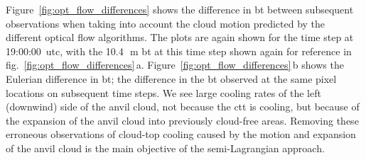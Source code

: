 Figure~\ref{fig:opt_flow_differences} shows the difference in \acrshort{bt} between subsequent observations when taking into account the cloud motion predicted by the different optical flow algorithms.
The plots are again shown for the time step at 19:00:00~\acrshort{utc}, with the 10.4\,\unit{\mu m} \acrshort{bt} at this time step shown again for reference in fig.~\ref{fig:opt_flow_differences}\,a.
Figure~\ref{fig:opt_flow_differences}\,b shows the Eulerian difference in \acrshort{bt}; the difference in the \acrshort{bt} observed at the same pixel locations on subsequent time steps.
We see large cooling rates of the left (downwind) side of the anvil cloud, not because the \acrshort{ctt} is cooling, but because of the expansion of the anvil cloud into previously cloud-free areas.
Removing these erroneous observations of cloud-top cooling caused by the motion and expansion of the anvil cloud is the main objective of the semi-Lagrangian approach.


